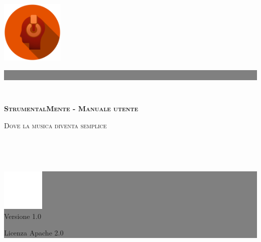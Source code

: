 \begin{titlingpage}
	\noindent\begin{minipage}{0.6\textwidth}
	\hspace*{1.5cm}\includegraphics[width=3cm]{../include/LogoStrumentalMente}
	\end{minipage}\begin{minipage}{0.4\textwidth}
	\colorbox{gray}{\parbox{\textwidth}{~\vspace*{5cm}}}
	\end{minipage}\\
	\colorbox{mainColor}{%
		\parbox[c][2.6cm][c]{\textwidth}{%
			\color{white}\huge\flushright \textsc{\bf StrumentalMente - Manuale utente}\hspace*{1.5cm}\par
			\Large \textsc{Dove la musica diventa semplice}\hspace*{1.5cm}
		}
	}\\
	\begin{minipage}{0.6\textwidth}
	~
	\end{minipage}\begin{minipage}{0.4\textwidth}
	\colorbox{gray}{%
		\parbox[c][9.3cm]{\textwidth}{%
			\color{white}\centering\vfill \includegraphics[width=2cm]{../include/Logo_FSC_DarkBg}\\[0.5cm]
			Versione 1.0\par
			Licenza Apache 2.0\vspace*{1cm}
		}
	}
	\end{minipage}
	\restoregeometry
\end{titlingpage}